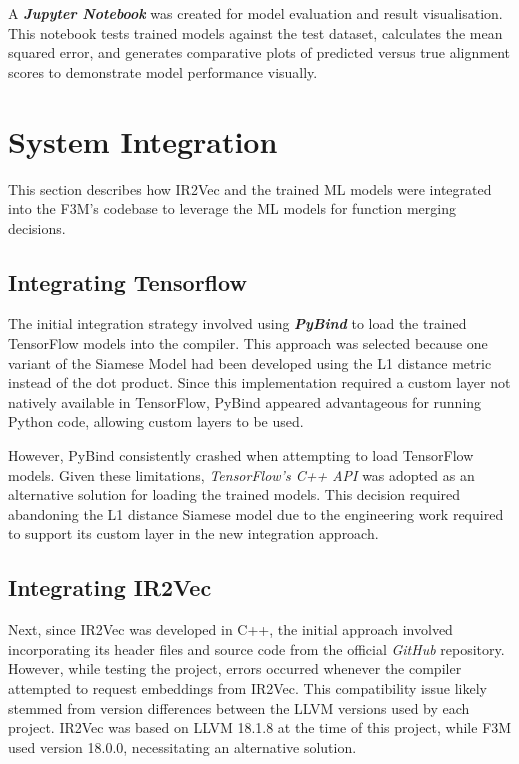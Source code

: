 A \textbf{\textit{Jupyter Notebook}} was created for model evaluation and result visualisation. This notebook tests trained models against the test dataset, calculates the mean squared error, and generates comparative plots of predicted versus true alignment scores to demonstrate model performance visually.

\section{System Integration} \label{Design:SystemIntegration}
This section describes how IR2Vec and the trained ML models were integrated into the F3M's codebase to leverage the ML models for function merging decisions.

\subsection{Integrating Tensorflow}
The initial integration strategy involved using \textbf{\textit{PyBind}} to load the trained TensorFlow models into the compiler. This approach was selected because one variant of the Siamese Model had been developed using the L1 distance metric instead of the dot product. Since this implementation required a custom layer not natively available in TensorFlow, PyBind appeared advantageous for running Python code, allowing custom layers to be used.

However, PyBind consistently crashed when attempting to load TensorFlow models. Given these limitations, \textit{TensorFlow's C++ API} was adopted as an alternative solution for loading the trained models. This decision required abandoning the L1 distance Siamese model due to the engineering work required to support its custom layer in the new integration approach.

\subsection{Integrating IR2Vec} \label{Design:IntegratingLLVM}
Next, since IR2Vec was developed in C++, the initial approach involved incorporating its header files and source code from the official \textit{GitHub} repository. However, while testing the project, errors occurred whenever the compiler attempted to request embeddings from IR2Vec. This compatibility issue likely stemmed from version differences between the LLVM versions used by each project. IR2Vec was based on LLVM 18.1.8 at the time of this project, while F3M used version 18.0.0, necessitating an alternative solution.


